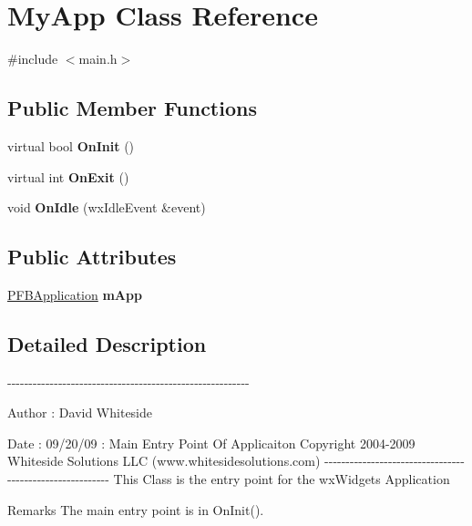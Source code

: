 \hypertarget{class_my_app}{
\section{MyApp Class Reference}
\label{class_my_app}
}


{\ttfamily \#include $<$main.h$>$}\subsection*{Public Member Functions}
\begin{DoxyCompactItemize}
\item 
\hypertarget{class_my_app_a79fa75d1155f0e85e20f2869538296d6}{
virtual bool {\bfseries OnInit} ()}
\label{class_my_app_a79fa75d1155f0e85e20f2869538296d6}

\item 
\hypertarget{class_my_app_ac89908f7a347ca2cc44611a4179b35ef}{
virtual int {\bfseries OnExit} ()}
\label{class_my_app_ac89908f7a347ca2cc44611a4179b35ef}

\item 
\hypertarget{class_my_app_a68465d7349785617829f608ca5c44302}{
void {\bfseries OnIdle} (wxIdleEvent \&event)}
\label{class_my_app_a68465d7349785617829f608ca5c44302}

\end{DoxyCompactItemize}
\subsection*{Public Attributes}
\begin{DoxyCompactItemize}
\item 
\hypertarget{class_my_app_aa1ab7952ed4f8ec8030a1466fd1645a0}{
\hyperlink{class_p_f_b_application}{PFBApplication} {\bfseries mApp}}
\label{class_my_app_aa1ab7952ed4f8ec8030a1466fd1645a0}

\end{DoxyCompactItemize}


\subsection{Detailed Description}
-\/-\/-\/-\/-\/-\/-\/-\/-\/-\/-\/-\/-\/-\/-\/-\/-\/-\/-\/-\/-\/-\/-\/-\/-\/-\/-\/-\/-\/-\/-\/-\/-\/-\/-\/-\/-\/-\/-\/-\/-\/-\/-\/-\/-\/-\/-\/-\/-\/-\/-\/-\/-\/-\/-\/-\/-\/ \begin{DoxyAuthor}{Author}
: David Whiteside 
\end{DoxyAuthor}
\begin{DoxyDate}{Date}
: 09/20/09 : Main Entry Point Of Applicaiton Copyright 2004-\/2009 Whiteside Solutions LLC (www.whitesidesolutions.com) -\/-\/-\/-\/-\/-\/-\/-\/-\/-\/-\/-\/-\/-\/-\/-\/-\/-\/-\/-\/-\/-\/-\/-\/-\/-\/-\/-\/-\/-\/-\/-\/-\/-\/-\/-\/-\/-\/-\/-\/-\/-\/-\/-\/-\/-\/-\/-\/-\/-\/-\/-\/-\/-\/-\/-\/-\/ This Class is the entry point for the wxWidgets Application 
\end{DoxyDate}
\begin{DoxyRemark}{Remarks}
The main entry point is in OnInit(). 
\end{DoxyRemark}


